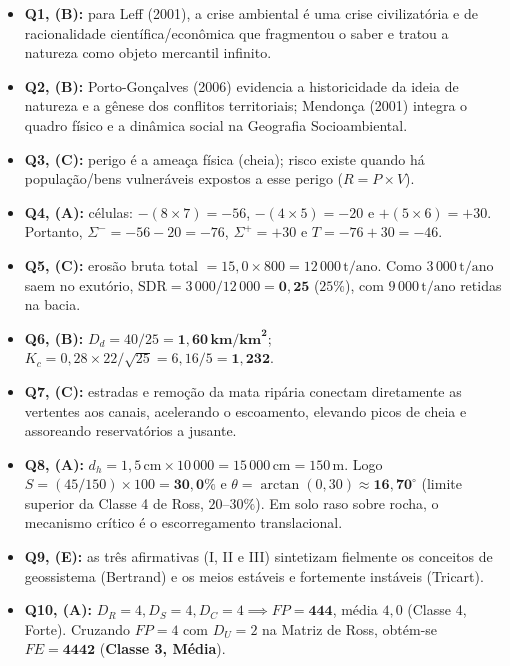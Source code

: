 \begin{boxGabarito}
  \begin{itemize}[leftmargin=1.5em, itemsep=3pt]
    \item \textbf{Q1, (B):} para Leff (2001), a crise ambiental é uma crise civilizatória e de racionalidade científica/econômica que fragmentou o saber e tratou a natureza como objeto mercantil infinito.
    \item \textbf{Q2, (B):} Porto-Gonçalves (2006) evidencia a historicidade da ideia de natureza e a gênese dos conflitos territoriais; Mendonça (2001) integra o quadro físico e a dinâmica social na Geografia Socioambiental.
    \item \textbf{Q3, (C):} perigo é a ameaça física (cheia); risco existe quando há população/bens vulneráveis expostos a esse perigo ($R = P \times V$).
    \item \textbf{Q4, (A):} células: $-(8 \times 7) = -56$, $-(4 \times 5) = -20$ e $+(5 \times 6) = +30$. Portanto, $\Sigma^{-} = -56 - 20 = -76$, $\Sigma^{+} = +30$ e $T = -76 + 30 = -46$.
    \item \textbf{Q5, (C):} erosão bruta total $= 15{,}0 \times 800 = 12\,000\,\text{t/ano}$. Como $3\,000\,\text{t/ano}$ saem no exutório, $\text{SDR} = 3\,000 / 12\,000 = \mathbf{0{,}25}$ ($25\%$), com $9\,000\,\text{t/ano}$ retidas na bacia.
    \item \textbf{Q6, (B):} $D_d = 40 / 25 = \mathbf{1{,}60\,\text{km/km}^2}$; $K_c = 0{,}28 \times 22 / \sqrt{25} = 6{,}16 / 5 = \mathbf{1{,}232}$.
    \item \textbf{Q7, (C):} estradas e remoção da mata ripária conectam diretamente as vertentes aos canais, acelerando o escoamento, elevando picos de cheia e assoreando reservatórios a jusante.
    \item \textbf{Q8, (A):} $d_h = 1{,}5\,\text{cm} \times 10\,000 = 15\,000\,\text{cm} = 150\,\text{m}$. Logo $S = (45 / 150) \times 100 = \mathbf{30{,}0\%}$ e $\theta = \arctan(0{,}30) \approx \mathbf{16{,}70^\circ}$ (limite superior da Classe 4 de Ross, $20\text{--}30\%$). Em solo raso sobre rocha, o mecanismo crítico é o escorregamento translacional.
    \item \textbf{Q9, (E):} as três afirmativas (I, II e III) sintetizam fielmente os conceitos de geossistema (Bertrand) e os meios estáveis e fortemente instáveis (Tricart).
    \item \textbf{Q10, (A):} $D_R=4, D_S=4, D_C=4 \implies FP = \mathbf{444}$, média $4{,}0$ (Classe 4, Forte). Cruzando $FP=4$ com $D_U=2$ na Matriz de Ross, obtém-se $FE = \mathbf{4442}$ (\textbf{Classe 3, Média}).
  \end{itemize}
\end{boxGabarito}

